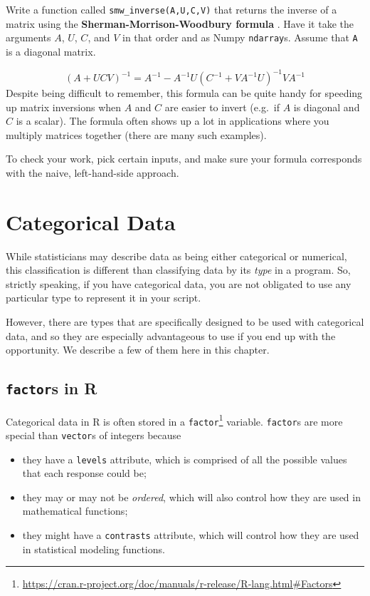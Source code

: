 \documentclass[12pt,krantz2]{krantz}
\providecommand{\tightlist}{%
  \setlength{\itemsep}{0pt}\setlength{\parskip}{0pt}}
\renewcommand{\href}[2]{#2\footnote{\url{#1}}}
\begin{document}
Write a function called \texttt{smw\_inverse(A,U,C,V)} that returns the inverse of a matrix using the \textbf{Sherman-Morrison-Woodbury formula} \citep{woodbury}. Have it take the arguments \(A\), \(U\), \(C\), and \(V\) in that order and as Numpy \texttt{ndarray}s. Assume that \texttt{A} is a diagonal matrix.

\begin{equation} 
(A + UCV)^{-1} = A^{-1} - A^{-1}U(C^{-1} + VA^{-1}U)^{-1}V A^{-1}
\end{equation}
Despite being difficult to remember, this formula can be quite handy for speeding up matrix inversions when \(A\) and \(C\) are easier to invert (e.g.~if \(A\) is diagonal and \(C\) is a scalar). The formula often shows up a lot in applications where you multiply matrices together (there are many such examples).

To check your work, pick certain inputs, and make sure your formula corresponds with the naive, left-hand-side approach.

\hypertarget{categorical-data}{%
\chapter{Categorical Data}\label{categorical-data}}

While statisticians may describe data as being either categorical or numerical, this classification is different than classifying data by its \emph{type} in a program. So, strictly speaking, if you have categorical data, you are not obligated to use any particular type to represent it in your script.

However, there are types that are specifically designed to be used with categorical data, and so they are especially advantageous to use if you end up with the opportunity. We describe a few of them here in this chapter.

\hypertarget{factors-in-r}{%
\section{\texorpdfstring{\texttt{factor}s in R}{factors in R}}\label{factors-in-r}}

Categorical data in R is often stored in a \href{https://cran.r-project.org/doc/manuals/r-release/R-lang.html\#Factors}{\texttt{factor}} variable. \texttt{factor}s are more special than \texttt{vector}s of integers because

\begin{itemize}
\tightlist
\item
  they have a \texttt{levels} attribute, which is comprised of all the possible values that each response could be;
\item
  they may or may not be \emph{ordered}, which will also control how they are used in mathematical functions;
\item
  they might have a \texttt{contrasts} attribute, which will control how they are used in statistical modeling functions.
\end{itemize}
\end{document}
